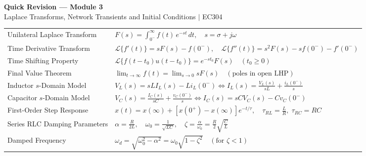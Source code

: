 \documentclass[12pt,a4paper]{article}
\renewcommand{\arraystretch}{1.45}
\begin{document}
\newpage
\begin{center}
  {\large\bfseries\color{myred} Quick Revision --- Module 3}\\[2pt]
  {\small\color{mydark} Laplace Transforms, Network Transients and Initial Conditions $|$ EC304}
\end{center}
\noindent{\color{myred}\rule{\linewidth}{1.0pt}}
\vspace{2pt}

\begin{tcolorbox}[formulabox, top=5pt, bottom=5pt, title={\textbf{Key Formulas and Network Relations at a Glance}}]
\renewcommand{\arraystretch}{1.20}
\begin{tabularx}{\linewidth}{B{5.0cm} X}
Unilateral Laplace Transform & $F(s) = \int_{0^-}^\infty f(t)\,e^{-st}\,dt, \quad s = \sigma + j\omega$ \\[2pt]
Time Derivative Transform & $\mathcal{L}\{f'(t)\} = sF(s) - f(0^-), \quad \mathcal{L}\{f''(t)\} = s^2F(s) - s f(0^-) - f'(0^-)$ \\[2pt]
Time Shifting Property & $\mathcal{L}\{f(t - t_0)u(t - t_0)\} = e^{-s t_0} F(s) \quad (t_0 \ge 0)$ \\[2pt]
Final Value Theorem & $\lim_{t \to \infty} f(t) = \lim_{s \to 0} s F(s) \quad (\text{poles in open LHP})$ \\[2pt]
Inductor $s$-Domain Model & $V_L(s) = sL I_L(s) - L i_L(0^-) \iff I_L(s) = \frac{V_L(s)}{sL} + \frac{i_L(0^-)}{s}$ \\[2pt]
Capacitor $s$-Domain Model & $V_C(s) = \frac{I_C(s)}{sC} + \frac{v_C(0^-)}{s} \iff I_C(s) = sC V_C(s) - C v_C(0^-)$ \\[2pt]
First-Order Step Response & $x(t) = x(\infty) + [x(0^+) - x(\infty)]e^{-t/\tau}, \quad \tau_{RL} = \frac{L}{R}, \; \tau_{RC} = RC$ \\[2pt]
Series RLC Damping Parameters & $\alpha = \frac{R}{2L}, \quad \omega_0 = \frac{1}{\sqrt{LC}}, \quad \zeta = \frac{\alpha}{\omega_0} = \frac{R}{2}\sqrt{\frac{C}{L}}$ \\[2pt]
Damped Frequency & $\omega_d = \sqrt{\omega_0^2 - \alpha^2} = \omega_0\sqrt{1 - \zeta^2} \quad (\text{for } \zeta < 1)$ \\[2pt]
\end{tabularx}
\end{tcolorbox}
\end{document}
